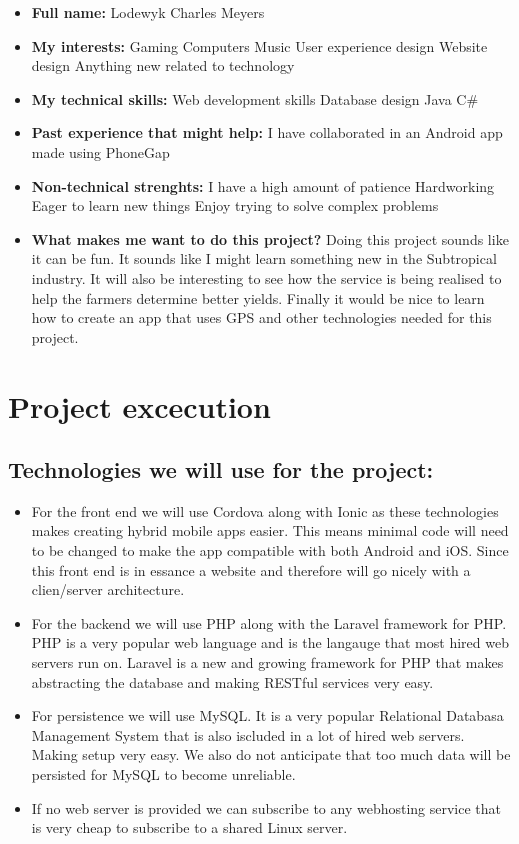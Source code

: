 \documentclass{article}
\begin{document}
	\begin{itemize}
		\item \textbf{Full name:} Lodewyk Charles Meyers
		\item \textbf{My interests:}
			\subitem Gaming
			\subitem Computers
			\subitem Music
			\subitem User experience design
			\subitem Website design
			\subitem Anything new related to technology
		\item \textbf{My technical skills:}
			\subitem Web development skills
			\subitem Database design
			\subitem Java
			\subitem C\#
		\item \textbf{Past experience that might help:}
			\subitem I have collaborated in an Android app made using PhoneGap
		\item \textbf{Non-technical strenghts:}
			\subitem I have a high amount of patience
			\subitem Hardworking
			\subitem Eager to learn new things
			\subitem Enjoy trying to solve complex problems
		\item \textbf{What makes me want to do this project?} Doing  this project sounds like it can be fun. It sounds like I might learn something new in the Subtropical industry. It will also be interesting to see how the service is being realised to help the farmers determine better yields. Finally it would be nice to learn how to create an app that uses GPS and other technologies needed for this project.
	\end{itemize}
	
	\section{Project excecution}
		\subsection{Technologies we will use for the project:}
			\begin{itemize}
				\item For the front end we will use Cordova along with Ionic as these technologies makes creating hybrid mobile apps easier. This means minimal code will need to be changed to make the app compatible with both Android and iOS. Since this front end is in essance a website and therefore will go nicely with a clien/server architecture.
				\item For the backend we will use PHP along with the Laravel framework for PHP. PHP is a very popular web language and is the langauge that most hired web servers run on. Laravel is a new and growing framework for PHP that makes abstracting the database and making RESTful services very easy.
				\item For persistence we will use MySQL. It is a very popular Relational Databasa Management System that is also iscluded in a lot of hired web servers. Making setup very easy. We also do not anticipate that too much data will be persisted for MySQL to become unreliable.
				\item If no web server is provided we can subscribe to any webhosting service that is very cheap to subscribe to a shared Linux server.
			\end{itemize}
\end{document}
